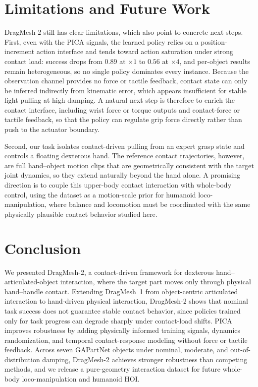 \documentclass{llmxive}
\begin{document}
\section{Limitations and Future Work}


DragMesh-2 still has clear limitations, which also point to concrete next steps. First, even with the PICA signals, the learned policy relies on a position-increment action interface and tends toward action saturation under strong contact load: success drops
from $0.89$ at $\times1$ to $0.56$ at $\times4$, and per-object results remain heterogeneous, so no single policy dominates every instance. Because the observation channel provides no force or tactile feedback, contact state can only be inferred indirectly from kinematic error, which appears insufficient for stable light pulling
at high damping. A natural next step is therefore to enrich the contact interface, including wrist force or torque outputs and contact-force or tactile feedback, so that the policy can regulate grip force directly rather than push to the actuator boundary.

Second, our task isolates contact-driven pulling from an expert grasp state and controls a floating dexterous hand. The reference contact
trajectories, however, are full hand--object motion clips that are geometrically consistent with the target joint dynamics, so they extend naturally beyond the hand alone. A promising direction is to couple this upper-body contact interaction with whole-body control, using the dataset as a motion-scale prior for humanoid loco-manipulation, where balance and locomotion must be coordinated with the same physically plausible contact behavior studied here.




\section{Conclusion}
\label{sec:conclusion}

We presented DragMesh-2, a contact-driven framework for dexterous hand--articulated-object interaction, where the target part moves only through physical hand--handle contact. Extending DragMesh~1 from object-centric articulated interaction to hand-driven physical interaction, DragMesh-2 shows that nominal task success does not guarantee stable contact behavior, since policies trained only for task progress can degrade sharply under contact-load shifts. PICA improves robustness by adding physically informed training signals, dynamics randomization, and temporal contact-response modeling without force or tactile feedback. Across seven GAPartNet objects under nominal, moderate, and out-of-distribution damping, DragMesh-2 achieves stronger robustness than competing methods, and we release a pure-geometry interaction dataset for future whole-body loco-manipulation and humanoid HOI.
\end{document}
